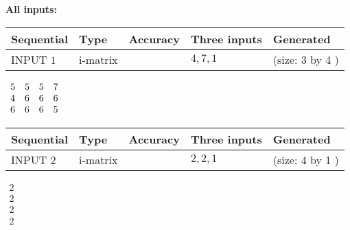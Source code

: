 \documentclass[12pt]{article}
\begin{document}
   
\noindent\vspace{0.1in}\hspace{-0.08in} {\textbf{\Large{All inputs: }}}
   
   
  
  
\noindent\begin{tabular}{|l|l|l|l|l|}
\hline
 Sequential & Type & Accuracy & Three inputs & Generated \\ 
\hline
 
 
  INPUT $            1 $ & i-matrix &  & $
 4
 , 
 7
 , 
 1
 $ & (size:            3  by            4 )
 \\  \hline  
 \end{tabular}
   
   
 $\begin{array}{
 c
 c
 c
 c
 }
           5  & 
           5  & 
           5  & 
           7  \\ 
           4  & 
           6  & 
           6  & 
           6  \\ 
           6  & 
           6  & 
           6  & 
           5
\end{array}  $ 
  
  
\noindent\begin{tabular}{|l|l|l|l|l|}
\hline
 Sequential & Type & Accuracy & Three inputs & Generated \\ 
\hline
 
 
  INPUT $            2 $ & i-matrix &  & $
 2
 , 
 2
 , 
 1
 $ & (size:            4  by            1 )
 \\  \hline  
 \end{tabular}
   
   
 $\begin{array}{
 c
 }
           2  \\ 
           2  \\ 
           2  \\ 
           2
\end{array}  $ 
  
\end{document}
